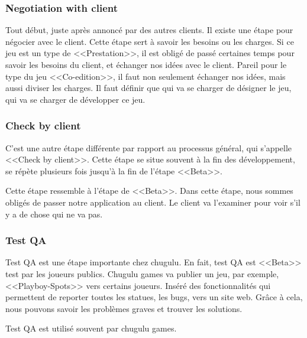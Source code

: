 \subsubsection{Negotiation with client} %
\label{ssub:negotiation_with_client_}

Tout début, juste après annoncé par des autres clients. Il existe une étape pour négocier avec le client. Cette étape sert à savoir les besoins ou les charges. Si ce jeu est un type de <<Prestation>>, il est obligé de passé certaines temps pour savoir les besoins du client, et échanger nos idées avec le client. Pareil pour le type du jeu <<Co-edition>>, il faut non seulement échanger nos idées, mais aussi diviser les charges. Il faut définir que qui va se charger de désigner le jeu, qui va se charger de développer ce jeu.


\subsubsection{Check by client} %
\label{ssub:check_by_client}

C'est une autre étape différente par rapport au processus général, qui s'appelle <<Check by client>>. Cette étape se situe souvent à la fin des développement, se répète plusieurs fois jusqu'à la fin de l'étape <<Beta>>. 

Cette étape ressemble à l'étape de <<Beta>>. Dans cette étape, nous sommes obligés de passer notre application au client. Le client va l'examiner pour voir s'il y a de chose qui ne va pas.


\subsubsection{Test QA} %
\label{ssub:test_qa}

Test QA est une étape importante chez chugulu. En fait, test QA est <<Beta>> test par les joueurs publics. Chugulu games va publier un jeu, par exemple, <<Playboy-Spots>> vers certains joueurs. Inséré des fonctionnalités qui permettent de reporter toutes les statues, les bugs, vers un site web. Grâce à cela, nous pouvons savoir les problèmes graves et trouver les solutions.

Test QA est utilisé souvent par chugulu games.  


